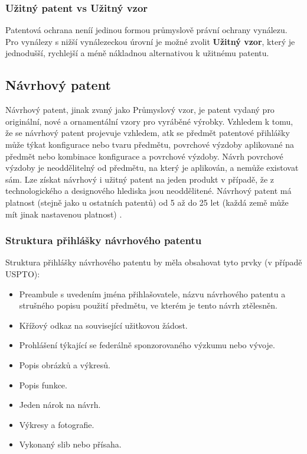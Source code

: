 \subsubsection{Užitný patent vs Užitný vzor}
Patentová ochrana neníí jedinou formou průmyslově právní ochrany vynálezu. Pro vynálezy s nižší vynálezeckou úrovní je možné zvolit \textbf{Užitný vzor}, který je jednodušší, rychlejší a méně nákladnou alternativou k užitnému patentu.

\subsection{Návrhový patent}
Návrhový patent, jinak zvaný jako Průmyslový vzor, je patent vydaný pro originální, nové a ornamentální vzory pro vyráběné výrobky. Vzhledem k tomu, že se návrhový patent projevuje vzhledem, atk se předmět patentové přihlášky může týkat konfigurace nebo tvaru předmětu, povrchové výzdoby aplikované na předmět nebo kombinace konfigurace a povrchové výzdoby. Návrh povrchové výzdoby je neoddělitelný od předmětu, na který je aplikován, a nemůže existovat sám. Lze získat návrhový i užitný patent na jeden produkt v případě, že z technologického a designového hlediska jsou neoddělitené. Návrhový patent má platnost (stejně jako u ostatních patentů) od 5 až do 25 let (každá země může mít jinak nastavenou platnost) \cite{usptoDesignPatent, patentIntroduction}.

\subsubsection{Struktura přihlášky návrhového patentu}
Struktura přihlášky návrhového patentu by měla obsahovat tyto prvky (v případě \gls{USPTO}):
\begin{itemize}
\item Preambule s uvedením jména přihlašovatele, názvu návrhového patentu a strušného popisu použití předmětu, ve kterém je tento návrh ztělesněn.
\item Křížový odkaz na související užitkovou žádost.
\item Prohlášení týkající se federálně sponzorovaného výzkumu nebo vývoje.
\item Popis obrázků a výkresů.
\item Popis funkce.
\item Jeden nárok na návrh.
\item Výkresy a fotografie.
\item Vykonaný slib nebo přísaha.
\end{itemize}

